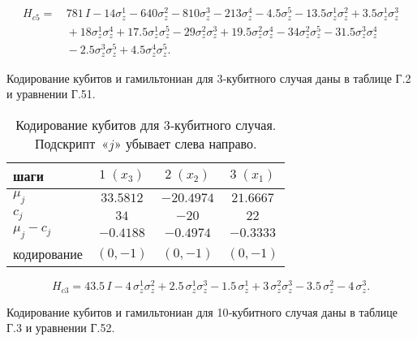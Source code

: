 \begin{equation}
\begin{aligned}
H_{c5}=\, &781\,I
- 14\sigma_{z}^{1}
- 640\sigma_{z}^{2}
- 810\sigma_{z}^{3}
- 213\sigma_{z}^{4}
- 4.5\sigma_{z}^{5}
- 13.5\sigma_{z}^{1}\sigma_{z}^{2}
+ 3.5\sigma_{z}^{1}\sigma_{z}^{3} \\[2pt]
&{}+ 18\sigma_{z}^{1}\sigma_{z}^{4}
+ 17.5\sigma_{z}^{1}\sigma_{z}^{5}
- 29\sigma_{z}^{2}\sigma_{z}^{3}
+ 19.5\sigma_{z}^{2}\sigma_{z}^{4}
- 34\sigma_{z}^{2}\sigma_{z}^{5}
- 31.5\sigma_{z}^{3}\sigma_{z}^{4} \\[2pt]
&{}- 2.5\sigma_{z}^{3}\sigma_{z}^{5}
+ 4.5\sigma_{z}^{4}\sigma_{z}^{5}.
\end{aligned}
\end{equation}

Кодирование кубитов и гамильтониан для 3‑кубитного случая даны в таблице Г.2 и
уравнении Г.51.

\begin{table}[h]
    \centering
    \caption{
        Кодирование кубитов для 3‑кубитного случая. Подскрипт~«$j$» убывает
        слева направо.
    }
\begin{tabular}{@{}lccc@{}}
\hline\hline
\textbf{шаги} &
\(\;1\;(x_{3})\;\) &
\(2\;(x_{2})\) &
\(3\;(x_{1})\) \\ \hline
\(\mu_{j}\)      & $ 33.5812$ & $-20.4974$ & $21.6667$ \\
\(c_{j}\)        & $     34$ &     $-20$  &     $ 22$ \\
\(\mu_{j}-c_{j}\)& $-0.4188$ & $-0.4974$ & $-0.3333$ \\
кодирование     & $(0,-1)$ & $(0,-1)$ & $(0,-1)$ \\
\hline\hline
\end{tabular}
    \label{tab:tab4}
\end{table}

\begin{equation}
H_{c3}=43.5\,I
- 4\,\sigma_{z}^{1}\sigma_{z}^{2}
+ 2.5\,\sigma_{z}^{1}\sigma_{z}^{3}
- 1.5\,\sigma_{z}^{1}
+ 3\,\sigma_{z}^{2}\sigma_{z}^{3}
- 3.5\,\sigma_{z}^{2}
- 4\,\sigma_{z}^{3}.
\end{equation}

Кодирование кубитов и гамильтониан для 10‑кубитного случая даны в таблице Г.3 и
уравнении Г.52.


